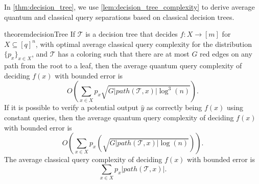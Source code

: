 \documentclass[cleveref, autoref, thm-restate,11pt]{article}
\theoremstyle{definition}
\newcommand{\sop}[1]{{\mathcal #1}}
\begin{document}
In \cref{thm:decision_tree}, we use \cref{lem:decision_tree_complexity} 
to derive average quantum and classical query 
separations based on classical decision trees. 

\begin{restatable}{theorem}{decisionTree}\label{thm:decision_tree} If $\sop T$ is a decision tree that
 decides $f:X\rightarrow[m]$ for $X\subseteq [q]^n$, with optimal average
 classical query complexity for the distribution $\{p_x\}_{x\in X}$, and $\sop T$ has
 a coloring such that there are at most $G$ red edges on
 any path from the root to a leaf, then the average quantum query complexity
 of deciding $f(x)$ with bounded error is 
 \begin{equation}
 O\left(\sum_{x\in X}p_x\sqrt{G|path(\sop T,x)|\log^3(n)}\right).
 \end{equation}
If it is possible to verify a potential output $\hat{y}$ as correctly being $f(x)$ using constant queries, then 
the average quantum query complexity
 of deciding $f(x)$ with bounded error is 
 \begin{equation}
 O\left(\sum_{x\in X}p_x\left(\sqrt{G|path(\sop T,x)|\log(n)}\right)\right).
 \end{equation}
The average classical query complexity of deciding $f(x)$ with bounded
error is
\begin{equation}\label{eq:class_decision}
\sum_{x\in X}p_x|path(\sop T,x)|.
\end{equation}
\end{restatable}
\end{document}

